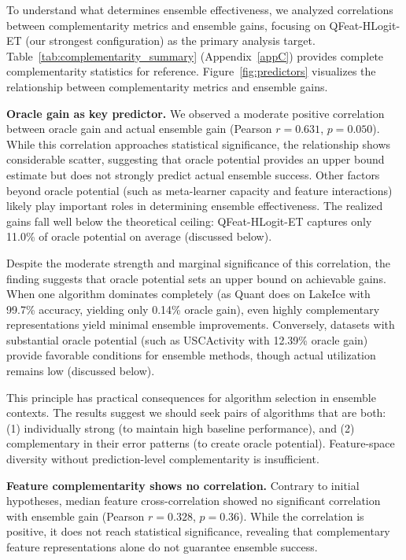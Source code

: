 \documentclass[pdflatex,sn-basic]{sn-jnl}           %
\theoremstyle{thmstyleone}%
\theoremstyle{thmstyletwo}%
\theoremstyle{thmstylethree}%
\begin{document}
To understand what determines ensemble effectiveness, we analyzed correlations between complementarity metrics and ensemble gains, focusing on QFeat-HLogit-ET (our strongest configuration) as the primary analysis target. Table~\ref{tab:complementarity_summary} (Appendix~\ref{appC}) provides complete complementarity statistics for reference. Figure~\ref{fig:predictors} visualizes the relationship between complementarity metrics and ensemble gains.

\textbf{Oracle gain as key predictor.} We observed a moderate positive correlation between oracle gain and actual ensemble gain (Pearson $r=0.631$, $p=0.050$). While this correlation approaches statistical significance, the relationship shows considerable scatter, suggesting that oracle potential provides an upper bound estimate but does not strongly predict actual ensemble success. Other factors beyond oracle potential (such as meta-learner capacity and feature interactions) likely play important roles in determining ensemble effectiveness. The realized gains fall well below the theoretical ceiling: QFeat-HLogit-ET captures only 11.0\% of oracle potential on average (discussed below).

Despite the moderate strength and marginal significance of this correlation, the finding suggests that oracle potential sets an upper bound on achievable gains. When one algorithm dominates completely (as Quant does on LakeIce with 99.7\% accuracy, yielding only 0.14\% oracle gain), even highly complementary representations yield minimal ensemble improvements. Conversely, datasets with substantial oracle potential (such as USCActivity with 12.39\% oracle gain) provide favorable conditions for ensemble methods, though actual utilization remains low (discussed below).

This principle has practical consequences for algorithm selection in ensemble contexts. The results suggest we should seek pairs of algorithms that are both: (1) individually strong (to maintain high baseline performance), and (2) complementary in their error patterns (to create oracle potential). Feature-space diversity without prediction-level complementarity is insufficient.

\textbf{Feature complementarity shows no correlation.} Contrary to initial hypotheses, median feature cross-correlation showed no significant correlation with ensemble gain (Pearson $r=0.328$, $p=0.36$). While the correlation is positive, it does not reach statistical significance, revealing that complementary feature representations alone do not guarantee ensemble success.
\end{document}
